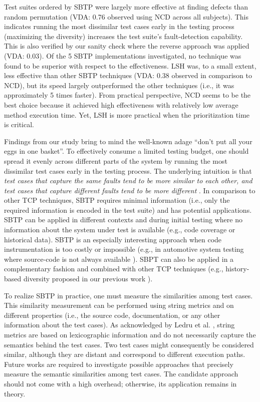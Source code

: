 \documentclass[runningheads]{llncs}
\begin{document}
Test suites ordered by SBTP were largely more effective at finding defects than random permutation (VDA: 0.76 observed using NCD across all subjects). This indicates running the most dissimilar test cases early in the testing process (maximizing the diversity) increases the test suite's fault-detection capability. This is also verified by our sanity check where the reverse approach was applied (VDA: 0.03). Of the 5 SBTP implementations investigated, no technique was found to be superior with respect to the effectiveness. LSH was, to a small extent, less effective than other SBTP techniques (VDA: 0.38 observed in comparison to NCD), but its speed largely outperformed the other techniques (i.e., it was approximately 5 times faster). From practical perspective, NCD seems to be the best choice because it achieved high effectiveness with relatively low average method execution time. Yet, LSH is more practical when the prioritization time is critical.

Findings from our study bring to mind the well-known adage \enquote{don't put all your eggs in one basket}. To effectively consume a limited testing budget, one should spread it evenly across different parts of the system by running the most dissimilar test cases early in the testing process. The underlying intuition is that \textit{test cases that capture the same faults tend to be more similar to each other, and test cases that capture different faults tend to be more different} \cite{jiang2009adaptive,hemmati2010reducing,ledru2012prioritizing}. In comparison to other TCP techniques, SBTP requires minimal information (i.e., only the required information is encoded in the test suite) and has potential applications. SBTP can be applied in different contexts and during initial testing where no information about the system under test is available (e.g., code coverage or historical data). SBTP is an especially interesting approach when code instrumentation is too costly or impossible (e.g., in automotive system testing where source-code is not always available \cite{haghighatkhah2017improving,haghighatkhah2017automotive}). SBPT can also be applied in a complementary fashion and combined with other TCP techniques (e.g., history-based diversity proposed in our previous work \cite{haghighatkhah2018test}).


To realize SBTP in practice, one must measure the similarities among test cases. This similarity measurement can be performed using string metrics and on different properties (i.e., the source code, documentation, or any other information about the test cases). As acknowledged by Ledru et al. \cite{ledru2012prioritizing}, string metrics are based on lexicographic information and do not necessarily capture the semantics behind the test cases. Two test cases might consequently be considered similar, although they are distant and correspond to different execution paths. Future works are required to investigate possible approaches that precisely measure the semantic similarities among test cases. The candidate approach should not come with a high overhead; otherwise, its application remains in theory.
\end{document}
